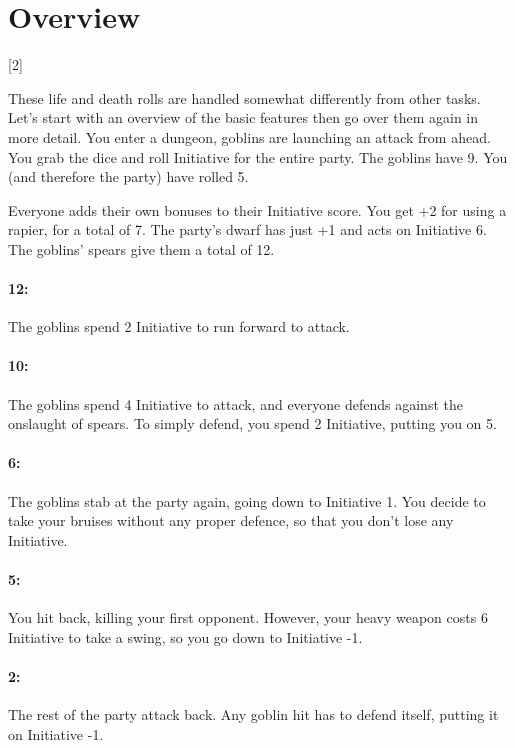 \section{Overview}

\begin{multicols}{2}

\startcontents[Combat]

[2]{}

These life and death rolls are handled somewhat differently from other tasks. Let's start with an overview of the basic features then go over them again in more detail. 
You enter a dungeon, goblins are launching an attack from ahead.
You grab the dice and roll Initiative for the entire party.
The goblins have 9.
You (and therefore the party) have rolled 5.

Everyone adds their own bonuses to their Initiative score.
You get +2 for using a rapier, for a total of 7.
The party's dwarf has just +1 and acts on Initiative 6.
The goblins' spears give them a total of 12.

\paragraph{12:} The goblins spend 2 Initiative to run forward to attack.

\paragraph{10:} The goblins spend 4 Initiative to attack, and everyone defends against the onslaught of spears.
To simply defend, you spend 2 Initiative, putting you on 5.
\paragraph{6:} The goblins stab at the party again, going down to Initiative 1.
You decide to take your bruises without any proper defence, so that you don't lose any Initiative.
\paragraph{5:} You hit back, killing your first opponent.
However, your heavy weapon costs 6 Initiative to take a swing, so you go down to Initiative -1.
\paragraph{2:} The rest of the party attack back.
Any goblin hit has to defend itself, putting it on Initiative -1.

\end{multicols}
